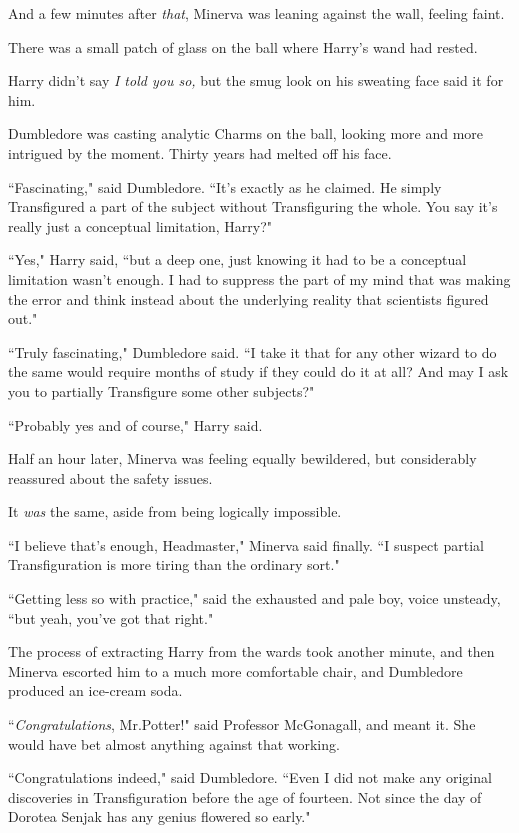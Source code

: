 And a few minutes after \emph{that}, Minerva was leaning against the wall, feeling faint.

There was a small patch of glass on the ball where Harry's wand had rested.

Harry didn't say \emph{I told you so,} but the smug look on his sweating face said it for him.

Dumbledore was casting analytic Charms on the ball, looking more and more intrigued by the moment. Thirty years had melted off his face.

``Fascinating," said Dumbledore. ``It's exactly as he claimed. He simply Transfigured a part of the subject without Transfiguring the whole. You say it's really just a conceptual limitation, Harry?"

``Yes," Harry said, ``but a deep one, just knowing it had to be a conceptual limitation wasn't enough. I had to suppress the part of my mind that was making the error and think instead about the underlying reality that scientists figured out."

``Truly fascinating," Dumbledore said. ``I take it that for any other wizard to do the same would require months of study if they could do it at all? And may I ask you to partially Transfigure some other subjects?"

``Probably yes and of course," Harry said.

Half an hour later, Minerva was feeling equally bewildered, but considerably reassured about the safety issues.

It \emph{was} the same, aside from being logically impossible.

``I believe that's enough, Headmaster," Minerva said finally. ``I suspect partial Transfiguration is more tiring than the ordinary sort."

``Getting less so with practice," said the exhausted and pale boy, voice unsteady, ``but yeah, you've got that right."

The process of extracting Harry from the wards took another minute, and then Minerva escorted him to a much more comfortable chair, and Dumbledore produced an ice-cream soda.

``\emph{Congratulations}, Mr.\?Potter!" said Professor McGonagall, and meant it. She would have bet almost anything against that working.

``Congratulations indeed," said Dumbledore. ``Even I did not make any original discoveries in Transfiguration before the age of fourteen. Not since the day of Dorotea Senjak has any genius flowered so early."


